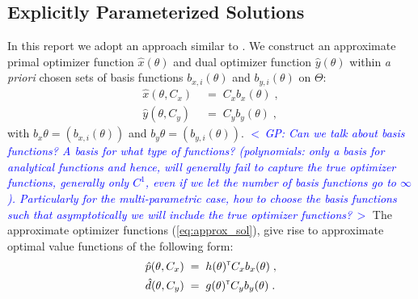 \documentclass{article}
\renewcommand{\t}{^{\mbox{\tiny \sf T}}}    %
\newcommand{\ppar}{\theta}                  %
\newcommand{\Ppar}{\Theta}                  %
\newcommand{\commentGP}[1]{\noindent \textcolor{blue}{\emph{$<\,$GP: #1$\,>$}}}%
\begin{document}
\subsection{Explicitly Parameterized Solutions}\label{subsec:parameterized_solution}%

In this report we adopt an approach similar to \cite{Oishi2013}. We construct an approximate primal optimizer function $\hat{x}(\ppar)$ and dual optimizer function $\hat{y}(\ppar)$ within \textit{a priori} chosen sets of basis functions $b_{x,i}(\ppar)$ and $b_{y,i}(\ppar)$ on $\Ppar$:
\begin{subequations}\label{eq:approx_sol}
\begin{align}
\hat{x}(\ppar, C_x) &\;=\; C_x b_x(\ppar)\;, \label{eq:approx_sol_primal}\\
\hat{y}(\ppar, C_y) &\;=\; C_y b_y(\ppar)\;, \label{eq:approx_sol_dual}
\end{align}
\end{subequations}
with $b_x{\ppar}=(b_{x,i}(\ppar))$ and $b_y{\ppar}=(b_{y,i}(\ppar))$. \commentGP{Can we talk about basis functions? A basis for what type of functions? (polynomials: only a basis for analytical functions and hence, will generally fail to capture the true optimizer functions, generally only $C^1$, even if we let the number of basis functions go to $\infty$). Particularly for the multi-parametric case, how to choose the basis functions such that asymptotically we will include the true optimizer functions?} The approximate optimizer functions (\ref{eq:approx_sol}), give rise to approximate optimal value functions of the following form:
\begin{align*}
\hat{p}(\ppar, C_x) &\;=\;  h(\ppar)\t  C_x b_x(\ppar)\;,\\
\hat{d}(\ppar, C_y) &\;=\;  g(\ppar)\t  C_y b_y(\ppar)\;.
\end{align*}
\end{document}
